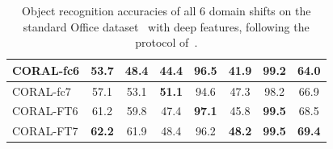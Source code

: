 \documentclass[letterpaper]{article}
\begin{document}
\begin{table}[t]
\begin{center}
{\begin{tabular}{|l||c|c|c|c|c|c|c|}
\hline
\hline
CORAL-fc6	&53.7	&48.4	&44.4	&96.5	&41.9	&99.2&64.0\\
\hline
CORAL-fc7	&57.1	&53.1	&\textbf{51.1}	&94.6	&47.3	&98.2&66.9\\
\hline
CORAL-FT6	&61.2	&59.8	&47.4	&\textbf{97.1}	&45.8	&\textbf{99.5}&68.5\\
\hline
CORAL-FT7	&\textbf{62.2}	&61.9	&48.4	&96.2	&\textbf{48.2}	&\textbf{99.5}&\textbf{69.4}\\
\hline
\end{tabular}
}
\end{center}
\caption{\small Object recognition accuracies of all 6 domain shifts on the standard Office dataset~\cite{saenko2010adapting} with deep features, following the protocol of~\cite{decaf,tzeng_arxiv15,reversegrad}. }
\label{tab:result_office10}
\vspace{-0.1in}
\end{table}

\begin{table}\small
\centering
{}
\caption{\small Object recognition accuracies of all 12 domain shifts on the Office-Caltech10 dataset~\cite{gfk} with SURF features, using the~\emph{``full training''} protocol.}
\label{tab:result_office10_large}
\vspace{-0.1in}
\end{table}
\end{document}
